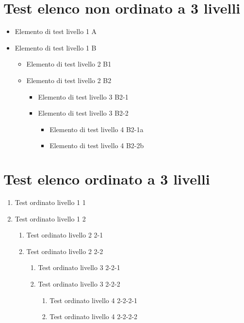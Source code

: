 \documentclass[it]{../../elegantbook}
\begin{document}
\section{Test elenco non ordinato a 3 livelli}
\begin{itemize}
\item Elemento di test livello 1 A
\item Elemento di test livello 1 B
    \begin{itemize}
    \item Elemento di test livello 2 B1
    \item Elemento di test livello 2 B2
        \begin{itemize}
        \item Elemento di test livello 3 B2-1
        \item Elemento di test livello 3 B2-2
            \begin{itemize}
            \item Elemento di test livello 4 B2-1a
            \item Elemento di test livello 4 B2-2b
            \end{itemize}
        \end{itemize}
    \end{itemize}
\end{itemize}

\section{Test elenco ordinato a 3 livelli}
\begin{enumerate}
\item Test ordinato livello 1 1
\item Test ordinato livello 1 2
    \begin{enumerate}
    \item Test ordinato livello 2 2-1
    \item Test ordinato livello 2 2-2
        \begin{enumerate}
        \item Test ordinato livello 3 2-2-1
        \item Test ordinato livello 3 2-2-2
            \begin{enumerate}
            \item Test ordinato livello 4 2-2-2-1
            \item Test ordinato livello 4 2-2-2-2
            \end{enumerate}
        \end{enumerate}
    \end{enumerate}
\end{enumerate}
\end{document}
